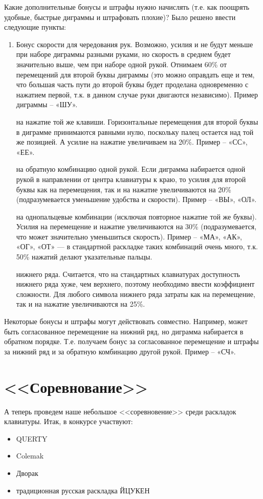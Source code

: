 \documentclass[14pt]{article} %
\begin{document}
Какие дополнительные бонусы и штрафы нужно начислять (т.е. как поощрять удобные, быстрые диграммы и штрафовать плохие)? Было решено ввести следующие пункты:
\begin{enumerate}
\item
Бонус скорости для чередования рук. Возможно, усилия и не будут меньше при наборе диграммы разными руками, но скорость в среднем будет значительно выше, чем при наборе одной рукой. Отнимаем 60\% от перемещений для второй буквы диграммы (это можно оправдать еще и тем, что большая часть пути до второй буквы будет проделана одновременно с нажатием первой, т.к. в данном случае руки двигаются независимо). Пример диграммы – «ШУ».

 на нажатие той же клавиши. Горизонтальные перемещения для второй буквы в диграмме принимаются равными нулю, поскольку палец остается над той же позицией. А усилие на нажатие увеличиваем на 20\%. Пример – «СС», «ЕЕ».

 на обратную комбинацию одной рукой. Если диграмма набирается одной рукой в направлении от центра клавиатуры к краю, то усилия для второй буквы как на перемещения, так и на нажатие увеличиваются на 20\% (подразумевается уменьшение удобства и скорости). Пример – «ВЫ», «ОЛ».

 на однопальцевые комбинации (исключая повторное нажатие той же буквы). Усилия на перемещение и нажатие увеличиваются на 30\% (подразумевается, что может значительно уменьшиться скорость). Пример – «МА», «АК», «ОГ», «ОТ» — в стандартной раскладке таких комбинаций очень много, т.к. 50\% нажатий делают указательные пальцы.

 нижнего ряда. Считается, что на стандартных клавиатурах доступность нижнего ряда хуже, чем верхнего, поэтому необходимо ввести коэффициент сложности. Для любого символа нижнего ряда затраты как на перемещение, так и на нажатие увеличиваются на 25\%.
\end{enumerate}
Некоторые бонусы и штрафы могут действовать совместно. Например, может быть согласованное перемещение на нижний ряд, но диграмма набирается в обратном порядке. Т.е. получаем бонус за согласованное перемещение и штрафы за нижний ряд и за обратную комбинацию другой рукой. Пример – «СЧ».

\section{<<Соревнование>>}
А теперь проведем наше небольшое <<соревновение>> среди раскладок клавиатуры. Итак, в конкурсе участвуют:
\begin{itemize}
\item QUERTY
\item Colemak
\item Дворак
\item традиционная русская раскладка ЙЦУКЕН
\end{itemize}
\end{document}
